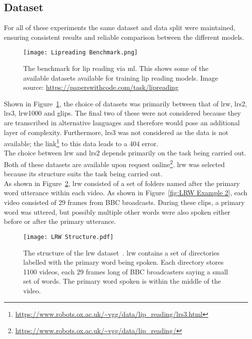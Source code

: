 \subsection{Dataset}
\label{sec: LRW Dataset}
For all of these experiments the same dataset and data split were maintained, ensuring consistent results and reliable comparison between the different models.\\
\begin{figure}
\centering
\texttt{[image: Lipreading Benchmark.png]}
\caption[The benchmark for lip reading via \acrshort{ml}]{The benchmark for lip reading via \acrshort{ml}. This shows some of the available datasets available for training lip reading models. Image source: \url{https://paperswithcode.com/task/lipreading}}
\label{fig:Lip Reading Benchmark}
\end{figure}
Shown in Figure~\ref{fig:Lip Reading Benchmark}, the choice of datasets was primarily between that of \gls{lrw}, \gls{lrs2}, \gls{lrs3}, \gls{lrw1000} and \gls{glips}. The final two of these were not considered because they are transcribed in alternative languages and therefore would pose an additional layer of complexity. Furthermore, \gls{lrs3} was not considered as the data is not available; the link\footnote{\url{https://www.robots.ox.ac.uk/~vgg/data/lip_reading/lrs3.html}} to this data leads to a 404 error.\\
The choice between \gls{lrw} and \gls{lrs2} depends primarily on the task being carried out. Both of these datasets are available upon request online\footnote{\url{https://www.robots.ox.ac.uk/~vgg/data/lip_reading/}}. \gls{lrw} was selected because its structure suits the task being carried out.\\
As shown in Figure~\ref{fig:LRW Structure}, \gls{lrw} consisted of a set of folders named after the primary word utterance within each video. As shown in Figure~\ref{fig:LRW Example 2}, each video consisted of 29 frames from BBC broadcasts. During these clips, a primary word was uttered, but possibly multiple other words were also spoken either before or after the primary utterance.\\
\begin{figure}
\centering
\texttt{[image: LRW Structure.pdf]}
\caption[The structure of the \gls{lrw} dataset.]{The structure of the \gls{lrw} dataset~\cite{Lip-Reading-In-The-Wild}. \gls{lrw} contains a set of directories labelled with the primary word being spoken. Each directory stores 1100 videos, each 29 frames long of BBC broadcasters saying a small set of words. The primary word spoken is within the middle of the video.}
\label{fig:LRW Structure}
\end{figure}
